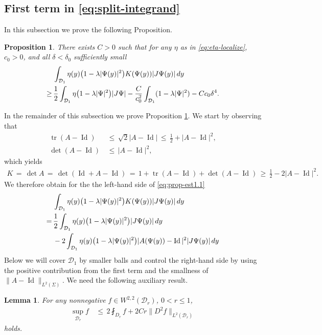 \documentclass[reqno,makeidx,12pt]{amsart}
\theoremstyle{note}
\newtheorem{lemma}{Lemma}
\newtheorem{proposition}{Proposition}
\theoremstyle{definition}
\begin{document}
\subsection{First term in \eqref{eq:split-integrand}}
In this subsection we prove the following Proposition.
\begin{proposition}\label{prop:est1.1}
There exists $C>0$ such that for any $\eta$ as in \eqref{eq:eta-localize}, $c_0>0$, and all $\delta<\delta_0$ sufficiently small
\begin{align}
	&\int_{{\mathcal{D}}_1} \eta(y) \big(1-\lambda |\Psi(y)|^2\big)K(\Psi(y)) |J\Psi(y)|\,dy \notag\\
	\geq\,& \frac{1}{2} \int_{{\mathcal{D}}_1} \eta \big(1-\lambda|\Psi|^2\big)|J\Psi| - \frac{C}{c_0^2} \int_{{\mathcal{D}}_1} (1-\lambda|\Psi|^2) - Cc_0\delta^4. \label{eq:prop-est1.1}
\end{align}
\end{proposition}
In the remainder of this subsection we prove Proposition \ref{prop:est1.1}. We start by observing that
\begin{align*}
	\operatorname{tr} (A-\operatorname{Id})\,&\leq\, \sqrt{2} |A-\operatorname{Id}| \,\leq\, \frac{1}{2} + |A-\operatorname{Id}|^2,\\
	\det(A-\operatorname{Id})\,&\leq\, |A-\operatorname{Id}|^2,
\end{align*}
which yields
\begin{gather*}
	K\,=\, \det A \,=\, \det (\operatorname{Id}+A-\operatorname{Id})\,=\, 1 +\operatorname{tr} (A-\operatorname{Id}) + \det (A-\operatorname{Id}) \,\geq\, \frac{1}{2} - 2|A-\operatorname{Id}|^2.
\end{gather*}
We therefore obtain for the the left-hand side of \eqref{eq:prop-est1.1}
\begin{align}
	&\int_{{\mathcal{D}}_1} \eta(y) \big(1-\lambda|\Psi(y)|^2\big)K(\Psi(y)) |J\Psi(y)|\,dy \notag\\
	=\,
  	&\frac{1}{2}\int_{{\mathcal{D}}_1} \eta(y) \big(1-\lambda|\Psi(y)|^2\big)|J\Psi(y)|\,dy \notag\\
	&- 2\int_{{\mathcal{D}}_1} \eta(y) \big(1-\lambda|\Psi(y)|^2\big)|A(\Psi(y))-\operatorname{Id}|^2 |J\Psi(y)|\,dy \label{eq:1st-term1}
\end{align}
Below we will cover ${\mathcal{D}}_1$ by smaller balls and control the right-hand side by using the positive contribution from the first term and the smallness of $\|A-\operatorname{Id}\|_{L^2(\Sigma)}$.
We need the following auxiliary result.
\begin{lemma}\label{eq:lemma-g3}
For any nonnegative $f\in W^{2,2}({\mathcal{D}}_r)$, $0<r\leq1$, 
\begin{align}
	\sup_{{\mathcal{D}}_r}f \,&\leq\, 2\fint_{D_r}f + 2 Cr\|D^2f\|_{L^2({\mathcal{D}}_r)} \label{eq:g3-2}
\end{align}
holds.
\end{lemma}
\end{document}
